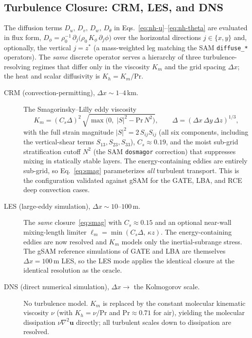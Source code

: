 \documentclass[11pt,twoside]{report}
\newcommand{\vect}[1]{\bm{#1}}
\begin{document}
\subsection{Turbulence Closure: CRM, LES, and DNS}
\label{sec:crm-les-dns}

The diffusion terms $D_u,\,D_v,\,D_w,\,D_\theta$ in
Eqs.~\eqref{eq:nh-u}--\eqref{eq:nh-theta} are evaluated in flux form,
$D_\phi = \rho_0^{-1}\,\partial_j\!\bigl(\rho_0\,K_\phi\,\partial_j\phi\bigr)$
over the horizontal directions $j\in\{x,y\}$ and, optionally, the vertical
$j=z^*$ (a mass-weighted leg matching the SAM \texttt{diffuse\_*}
operators).  The \emph{same} discrete operator serves a hierarchy of three
turbulence-resolving regimes that differ only in the viscosity $K_m$ and the
grid spacing $\Delta x$; the heat and scalar diffusivity is
$K_h = K_m/\mathrm{Pr}$.

\begin{description}
\item[CRM (convection-permitting), $\Delta x\sim 1$--$4$\,km.]
The Smagorinsky--Lilly eddy viscosity \citep{Smagorinsky1963}
\begin{equation}
  K_m = (C_s\Delta)^2\,
  \sqrt{\max\!\bigl(0,\;|S|^2 - \mathrm{Pr}\,N^2\bigr)},
  \qquad \Delta = (\Delta x\,\Delta y\,\Delta z)^{1/3},
  \label{eq:smag}
\end{equation}
with the full strain magnitude $|S|^2 = 2\,S_{ij}S_{ij}$ (all six
components, including the vertical-shear terms $S_{13},S_{23},S_{33}$),
$C_s\approx 0.19$, and the moist sub-grid stratification cutoff $N^2$ (the
SAM \texttt{dosmagor} correction) that suppresses mixing in statically
stable layers.  The energy-containing eddies are entirely sub-grid, so
Eq.~\eqref{eq:smag} parameterizes \emph{all} turbulent transport.  This is
the configuration validated against gSAM for the GATE, LBA, and RCE deep
convection cases.

\item[LES (large-eddy simulation), $\Delta x\sim 10$--$100$\,m.]
The \emph{same} closure~\eqref{eq:smag} with $C_s\approx 0.15$ and an
optional near-wall mixing-length limiter $\ell_m=\min(C_s\Delta,\,\kappa z)$.
The energy-containing eddies are now resolved and $K_m$ models only the
inertial-subrange stress.  The gSAM reference simulations of GATE and LBA
are themselves $\Delta x=100$\,m LES, so the LES mode applies the identical
closure at the identical resolution as the oracle.

\item[DNS (direct numerical simulation), $\Delta x\to$ the Kolmogorov scale.]
No turbulence model.  $K_m$ is replaced by the constant molecular kinematic
viscosity $\nu$ (with $K_h=\nu/\mathrm{Pr}$ and $\mathrm{Pr}\approx 0.71$ for
air), yielding the molecular dissipation $\nu\nabla^2\vect{u}$ directly; all
turbulent scales down to dissipation are resolved.
\end{description}
\end{document}
